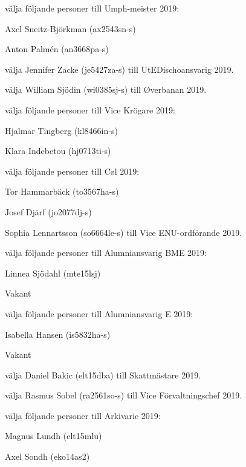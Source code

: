\documentclass[10pt]{article}
\begin{document}
\begin{paragrafer}
\begin{paralist}
    \Mba välja följande personer till Umph-meister 2019:
    \begin{tightdashlist}
        \item Axel Sneitz-Björkman (ax2543sn-s)
        \item Anton Palmén (an3668pa-s)
    \end{tightdashlist}

    \Mba välja Jennifer Zacke (je5427za-s) till UtEDischoansvarig 2019.

    \Mba välja William Sjödin (wi0385sj-s) till Øverbanan 2019.

    \Mba välja följande personer till Vice Krögare 2019:
    \begin{tightdashlist}
        \item Hjalmar Tingberg (kl8466in-s)
        \item Klara Indebetou (hj0713ti-s)
    \end{tightdashlist}

    \Mba välja följande personer till Cøl 2019:
    \begin{tightdashlist}
        \item Tor Hammarbäck (to3567ha-s)
        \item Josef Djärf (jo2077dj-s)
    \end{tightdashlist}

    \Mba Sophia Lennartsson (so6664le-s) till Vice ENU-ordförande 2019.

    \Mba välja följande personer till Alumniansvarig BME 2019:
    \begin{tightdashlist}
        \item Linnea Sjödahl (mte15lsj)
        \item Vakant
    \end{tightdashlist}

    \Mba välja följande personer till Alumniansvarig E 2019:
    \begin{tightdashlist}
        \item Isabella Hansen (is5832ha-s)
        \item Vakant
    \end{tightdashlist}

    \Mba välja Daniel Bakic (elt15dba) till Skattmästare 2019.

    \Mba välja Rasmus Sobel (ra2561so-s) till Vice Förvaltningschef 2019.

    \Mba välja följande personer till Arkivarie 2019:
    \begin{tightdashlist}
        \item Magnus Lundh (elt15mlu)
        \item Axel Sondh (eko14as2)
    \end{tightdashlist}


\end{paralist}
\end{paragrafer}
\end{document}
